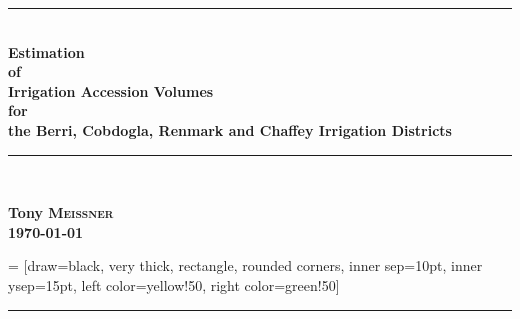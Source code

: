 \documentclass[a4paper, titlepage, 12pt]{article}\usepackage[]{graphicx}\usepackage[]{color}
\newcommand{\HRule}{\rule{\linewidth}{3.0mm}}
\begin{document}
\begin{sffamily}



\begin{titlepage}
\begin{center}

\color{blue}
\HRule \\ [0.5cm]
\color{black}
{ \huge \bfseries Estimation\\of\\Irrigation Accession Volumes\\for \\the Berri, Cobdogla, Renmark and Chaffey Irrigation Districts\\ [0.5cm]}
\color{green}
\HRule \\ [5.0cm]
\color{black}

\begin{center} \Large
\textbf{Tony \textsc{Meissner}} \\ [0.5cm]
{\large \textbf{\today}}
\end{center}

\color{blue}
\begin{flushright}

 = [draw=black, very thick, rectangle, rounded corners, inner sep=10pt, inner ysep=15pt, left color=yellow!50, right color=green!50]

\end{flushright}
\color{brown}
\HRule \\
\color{black}
\end{center}
\end{titlepage}




\end{sffamily}
\end{document}
